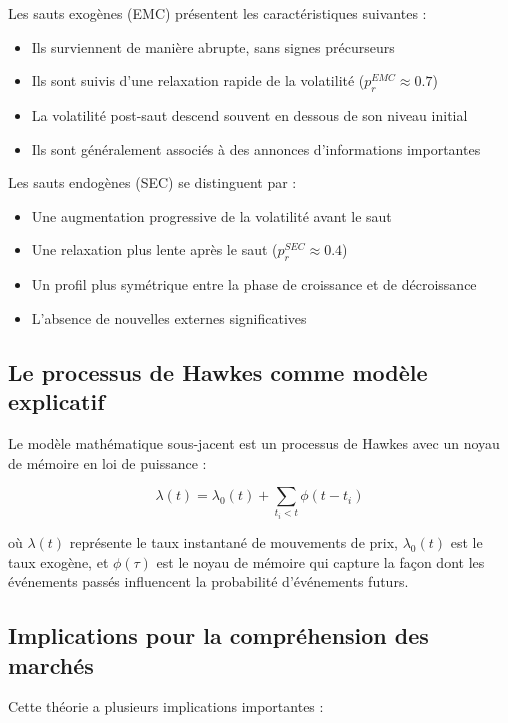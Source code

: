 \documentclass[10pt,a4paper]{article}
\theoremstyle{definition}
\theoremstyle{remark}
\begin{document}
\begin{itemize}
Les sauts exogènes (EMC) présentent les caractéristiques suivantes :
\begin{itemize}
    \item Ils surviennent de manière abrupte, sans signes précurseurs
    \item Ils sont suivis d'une relaxation rapide de la volatilité ($p_r^{EMC} \approx 0.7$)
    \item La volatilité post-saut descend souvent en dessous de son niveau initial
    \item Ils sont généralement associés à des annonces d'informations importantes
\end{itemize}

Les sauts endogènes (SEC) se distinguent par :
\begin{itemize}
    \item Une augmentation progressive de la volatilité avant le saut
    \item Une relaxation plus lente après le saut ($p_r^{SEC} \approx 0.4$)
    \item Un profil plus symétrique entre la phase de croissance et de décroissance
    \item L'absence de nouvelles externes significatives
\end{itemize}

\subsection{Le processus de Hawkes comme modèle explicatif}

Le modèle mathématique sous-jacent est un processus de Hawkes avec un noyau de mémoire en loi de puissance :

\begin{equation}
\lambda(t) = \lambda_0(t) + \sum_{t_i < t} \phi(t-t_i)
\end{equation}

où $\lambda(t)$ représente le taux instantané de mouvements de prix, $\lambda_0(t)$ est le taux exogène, et $\phi(\tau)$ est le noyau de mémoire qui capture la façon dont les événements passés influencent la probabilité d'événements futurs.

\subsection{Implications pour la compréhension des marchés}

Cette théorie a plusieurs implications importantes :


\end{itemize}
\end{document}
